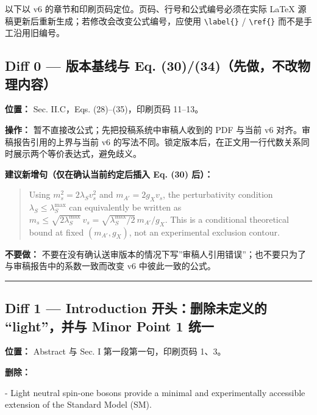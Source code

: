 \documentclass[
]{article}
\newenvironment{Shaded}{}{}
\newcommand{\StringTok}[1]{\textcolor[rgb]{0.25,0.44,0.63}{#1}}
\begin{document}
以下以 v6 的章节和印刷页码定位。页码、行号和公式编号必须在实际 LaTeX
源稿更新后重新生成；若修改会改变公式编号，应使用
\texttt{\textbackslash{}label\{\}} / \texttt{\textbackslash{}ref\{\}}
而不是手工沿用旧编号。

\subsection{Diff 0 --- 版本基线与 Eq.
(30)/(34)（先做，不改物理内容）}\label{diff-0-ux7248ux672cux57faux7ebfux4e0e-eq.-3034ux5148ux505aux4e0dux6539ux7269ux7406ux5185ux5bb9}

\textbf{位置：} Sec. II.C，Eqs. (28)--(35)，印刷页码 11--13。

\textbf{操作：} 暂不直接改公式；先把投稿系统中审稿人收到的 PDF 与当前 v6
对齐。审稿报告引用的上界与当前 v6
的写法不同。锁定版本后，在正文用一行代数关系同时展示两个等价表达式，避免歧义。

\textbf{建议新增句（仅在确认当前约定后插入 Eq. (30) 后）：}

\begin{quote}
Using \(m_s^2=2\lambda_Sv_s^2\) and \(m_{A'}=2g_Xv_s\), the
perturbativity condition \(\lambda_S\leq\lambda_S^{\max}\) can
equivalently be written as
\(m_s\leq\sqrt{2\lambda_S^{\max}}\,v_s=\sqrt{\lambda_S^{\max}/2}\,m_{A'}/g_X\).
This is a conditional theoretical bound at fixed \((m_{A'},g_X)\), not
an experimental exclusion contour.
\end{quote}

\textbf{不要做：}
不要在没有确认送审版本的情况下写''审稿人引用错误''；也不要只为了与审稿报告中的系数一致而改变
v6 中彼此一致的公式。

\begin{center}\rule{0.5\linewidth}{0.5pt}\end{center}

\subsection{Diff 1 --- Introduction 开头：删除未定义的 ``light''，并与
Minor Point 1
统一}\label{diff-1-introduction-ux5f00ux5934ux5220ux9664ux672aux5b9aux4e49ux7684-lightux5e76ux4e0e-minor-point-1-ux7edfux4e00}

\textbf{位置：} Abstract 与 Sec. I 第一段第一句，印刷页码 1、3。

\textbf{删除：}

\begin{Shaded}
\begin{Highlighting}[]
\StringTok{{-} Light neutral spin{-}one bosons provide a minimal and experimentally accessible extension of the Standard Model (SM).}
\end{Highlighting}
\end{Shaded}
\end{document}
